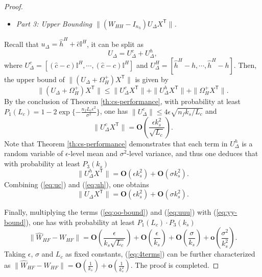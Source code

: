 \documentclass[12pt,journal,draftclsnofoot,onecolumn]{IEEEtran}
\let \sss=\scriptscriptstyle
\begin{document}
\begin{proof}
\begin{itemize}
\item \textit{Part 3: Upper Bounding $\| (W_{\sss HH} \!-\! I_{n_h}) U_{\Delta} X^\mathsf{T} \|$. }
\end{itemize}
Recall that $u_{\Delta}= \hat h^{\sss H} + \hat c \mathbb{I}^{\sss H}$, it can be split as 
\begin{equation}
U_{\Delta}=U_{\Delta}^c+U_{\Delta}^{h}, 
\end{equation}
where $ U_{\Delta}^c = [ (\hat c \!-\!c) \mathbb{I}^{\sss H},\cdots,(\hat c \!-\!c) \mathbb{I}^{\sss H}]$ and $ U_{\Delta}^H =[ \hat h^{\sss H} \!-\!h,\cdots,\hat h^{\sss H} \!-\! h]$. 
Then, the upper bound of $\| (U_{\Delta} + \Omega_{\sss H}^{+})X^\mathsf{T} \|$ is given by 
\begin{equation}
\| (U_{\Delta} + \Omega_{\sss H}^{+})X^\mathsf{T} \| \le \|U_{\Delta}^c X^\mathsf{T}\| + \|U_{\Delta}^h X^\mathsf{T}\| + \| \Omega_{\sss H}^{+}X^\mathsf{T} \|. 
\end{equation}
By the conclusion of Theorem \ref{th:cs-performance}, with probability at least $P_1(L_c)=1 - 2 \exp\{-\frac{ {n_f} {L_c}\epsilon^{2}}{\sigma^{2}}\}$, one has $\|U_{\Delta}^c\|\le 4\epsilon \sqrt{n_f k_s/L_c }$ and 
\begin{equation}\label{eq:uc}
 \|U_{\Delta}^c X^\mathsf{T} \|= \bm{O}( \frac{\epsilon k_s^2}{\sqrt{L_c}}). 
\end{equation}
Note that Theorem \ref{th:cs-performance} demonstrates that each term in $U_{\Delta}^h$ is a random variable of $\epsilon$-level mean and $\sigma^2$-level variance, and thus one deduces that with probability at least  $P_3(k_s)$
\begin{equation}\label{eq:uh}
 \|U_{\Delta}^h X^\mathsf{T} \|= \bm{O}( \epsilon k_s^2) + \bm{O}( \sigma k_s^2). 
\end{equation}
Combining (\ref{eq:uc}) and (\ref{eq:uh}), one obtains
\begin{equation}\label{eq:uuu}
 \|U_{\Delta} X^\mathsf{T} \|= \bm{O}( \epsilon k_s^2) + \bm{O}( \sigma k_s^2). 
\end{equation}


Finally, multiplying the terms (\ref{eq:oo-bound}) and (\ref{eq:uuu}) with (\ref{eq:yy-bound}), one has with probability at least $P_1(L_c)\cdot P_3(k_s)$
\begin{equation}\label{eq:4terms}
 \| \hat W_{\sss HF} \!-\!  W_{\sss HF}\| \!=\! \bm{O}( \frac{\epsilon }{k_s\sqrt{L_c}})  \!+\! \bm{O} ( \frac{\epsilon}{k_s}) + \bm{O} ( \frac{\sigma}{k_s})+ \bm{o}( \frac{\sigma^2}{k_s^2}).
\end{equation}
Taking $\epsilon$, $\sigma$ and $L_c$ as fixed constants, (\ref{eq:4terms}) can be further characterized as $\| \hat W_{\sss HF} -  W_{\sss HF}\|= \bm{O} ( \frac{1}{k_s}) + \bm{o}( \frac{1}{k_s^2})$. 
The proof is completed. 
\end{proof}
\end{document}
